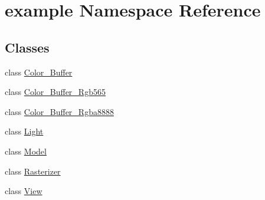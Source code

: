 \hypertarget{namespaceexample}{}\section{example Namespace Reference}
\label{namespaceexample}
\subsection*{Classes}
\begin{DoxyCompactItemize}
\item 
class \mbox{\hyperlink{classexample_1_1_color___buffer}{Color\+\_\+\+Buffer}}
\item 
class \mbox{\hyperlink{classexample_1_1_color___buffer___rgb565}{Color\+\_\+\+Buffer\+\_\+\+Rgb565}}
\item 
class \mbox{\hyperlink{classexample_1_1_color___buffer___rgba8888}{Color\+\_\+\+Buffer\+\_\+\+Rgba8888}}
\item 
class \mbox{\hyperlink{classexample_1_1_light}{Light}}
\item 
class \mbox{\hyperlink{classexample_1_1_model}{Model}}
\item 
class \mbox{\hyperlink{classexample_1_1_rasterizer}{Rasterizer}}
\item 
class \mbox{\hyperlink{classexample_1_1_view}{View}}
\end{DoxyCompactItemize}
